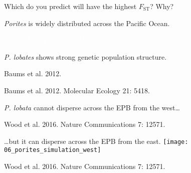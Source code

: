 \documentclass[t]{beamer}
\begin{document}
{
\begin{frame}[b]{Which do you predict will have the highest $F_\mathrm{ST}$? Why?}

\end{frame}
}
{
\begin{frame}[b]{\textit{Porites} is widely distributed across the Pacific Ocean.}

\hfill \tiny\textcolor{white}{Baums Lab, Penn State Univ.}
\end{frame}
}
%
%

{
\begin{frame}[b]{\textit{P. lobates} shows strong genetic population structure.}

\tiny Baums et al. 2012.
\end{frame}
}
%
{
\begin{frame}[b]

\hfill \tiny Baums et al. 2012. Molecular Ecology 21: 5418.
\end{frame}
}
%
{
\begin{frame}[b]{\textit{P. lobata} cannot disperse across the EPB from the west\dots}

\tiny Wood et al. 2016. Nature Communications 7: 12571.
\end{frame}
}
%
\begin{frame}[t]{\dots but it can disperse across the EPB from the east.}
\centering
\texttt{[image: 06\_porites\_simulation\_west]}

	\vfilll
\hfill \tiny Wood et al. 2016. Nature Communications 7: 12571.

\end{frame}
\end{document}
